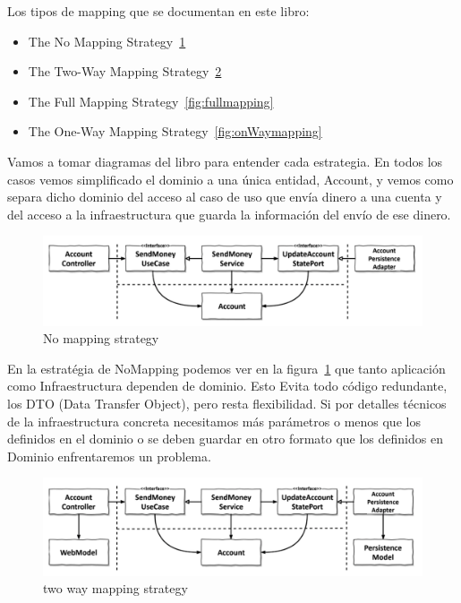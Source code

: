 Los tipos de mapping que se documentan en este libro:
\begin{itemize}
    \item The No Mapping Strategy~\cref{fig:nomapping}
    \item The Two-Way Mapping Strategy~\cref{fig:twowaymapping}
    \item The Full Mapping Strategy~\cref{fig:fullmapping}
    \item The One-Way Mapping Strategy~\cref{fig:onWaymapping}
\end{itemize}

Vamos a tomar diagramas del libro para entender cada estrategia. En todos los casos vemos simplificado el dominio a una única entidad, Account, y vemos como separa dicho dominio del acceso al caso de uso que envía dinero a una cuenta y del acceso a la infraestructura que guarda la información del envío de ese dinero.

\begin{figure}[H]
    \centering
    \includegraphics[height=0.1\textheight]{./part/Ejecucion/Seguimiento/CreateTaskUseCase/img/nomapping}
    \caption{No mapping strategy \cite{TomHombergs2019GYHD}}\label{fig:nomapping}
\end{figure}

En la estratégia de NoMapping podemos ver en la figura~\cref{fig:nomapping} que tanto aplicación como Infraestructura dependen de dominio. Esto Evita todo código redundante, los \gls{DTO} (Data Transfer Object), pero resta flexibilidad. Si por detalles técnicos de la infraestructura concreta necesitamos más parámetros o menos que los definidos en el dominio o se deben guardar en otro formato que los definidos en Dominio enfrentaremos un problema.

\begin{figure}[H]
    \centering
    \includegraphics[height=0.1\textheight]{./part/Ejecucion/Seguimiento/CreateTaskUseCase/img/twowaymapping}
    \caption{two way mapping strategy \cite{TomHombergs2019GYHD}}\label{fig:twowaymapping}
\end{figure}


